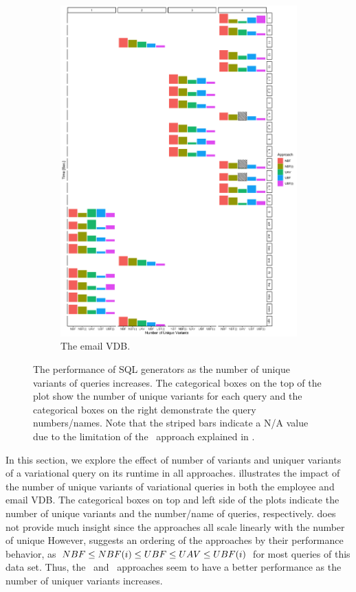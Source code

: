 \begin{figure}
\begin{subfigure}{.6\linewidth}
\includegraphics[width=\textwidth] {figs/plots/enron-comp-var.png}
\caption[The email VDB]{The email VDB.}
\label{fig:enron-var-comp}
\end{subfigure}
\caption[The performance of SQL generators as the number of unique variants of queries increases]{The performance of SQL generators as the number of unique variants of queries increases. The categorical boxes on the top of the plot show the number of
unique variants for each query and the categorical boxes on the right demonstrate the query 
numbers/names. Note that the striped bars indicate a N/A value due to the limitation of the
\uav\ approach explained in .}
\label{fig:var-comp}
\end{figure}


In this section, we explore the effect of number of variants and uniquer variants of a 
variational query on its runtime in all approaches. 
%
 illustrates the impact of the number of unique variants of variational
queries in both the employee and email VDB. 
%
The categorical boxes on top and left side of the plots indicate the number of unique
variants and the number/name of queries, respectively. 
%
 does 
not provide much insight since the approaches all scale linearly with the number of unique
However,  suggests an ordering of the approaches by their performance behavior, as $NBF \leq NBF(i) \leq UBF \leq UAV \leq UBF(i)$
for most queries of this data set. Thus, the \uav\ and \ubfi\ approaches seem to have
a better performance as the number of uniquer variants increases. 


